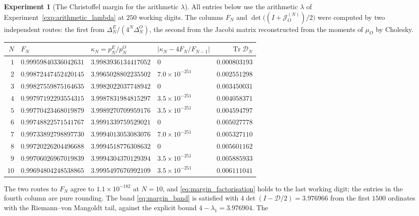 \documentclass[11pt]{amsart}
\numberwithin{equation}{section}
\theoremstyle{plain}
\theoremstyle{definition}
\newtheorem{experiment}[theorem]{Experiment}
\theoremstyle{remark}
\newcommand{\Tr}{\operatorname{Tr}}
\begin{document}
\begin{experiment}[The Christoffel margin for the arithmetic $\lambda$]
\label{exp:christoffel_margin}
All entries below use the arithmetic $\lambda$ of Experiment~\ref{exp:arithmetic_lambda}
at $250$ working digits.  The columns $F_N$ and $\det\bigl((I+\mathcal J_O^{(N)})/2\bigr)$ were
computed by two independent routes: the first from
$\Delta_N^E/(4^N\Delta_N^O)$, the second from the Jacobi matrix reconstructed from the
moments of $\mu_O$ by Cholesky.
\begin{center}
\small
\begin{tabular}{rlllr}
\toprule
$N$ & $F_N$ & $\kappa_N=p_N^E/p_N^O$ & $|\kappa_N-4F_N/F_{N-1}|$ & $\Tr\mathcal D_N$\\
\midrule
$1$  & $0.99959840336042631$ & $3.9983936134417052$ & $0$                  & $0.000803193$\\
$2$  & $0.99872447452420145$ & $3.9965028802235502$ & $7.0\times10^{-251}$ & $0.002551298$\\
$3$  & $0.99827559875164635$ & $3.9982022037748942$ & $0$                  & $0.003450031$\\
$4$  & $0.99797192293554315$ & $3.9987831984815297$ & $3.5\times10^{-251}$ & $0.004058371$\\
$5$  & $0.99770423468019879$ & $3.9989270709959176$ & $3.5\times10^{-251}$ & $0.004594797$\\
$6$  & $0.99748822571541767$ & $3.9991339759529021$ & $0$                  & $0.005027778$\\
$7$  & $0.99733892798897730$ & $3.9994013053083076$ & $7.0\times10^{-251}$ & $0.005327110$\\
$8$  & $0.99720226204496688$ & $3.9994518776308632$ & $0$                  & $0.005601162$\\
$9$  & $0.99706026967019839$ & $3.9994304370129394$ & $3.5\times10^{-251}$ & $0.005885933$\\
$10$ & $0.99694804248538865$ & $3.9995497676992109$ & $3.5\times10^{-251}$ & $0.006111041$\\
\bottomrule
\end{tabular}
\end{center}
The two routes to $F_N$ agree to $1.1\times10^{-182}$ at $N=10$, and
\eqref{eq:margin_factorisation} holds to the last working digit; the entries in the fourth
column are pure rounding.  The band \eqref{eq:margin_band} is satisfied with
$4\det(I-\mathcal D/2)=3.976966$ from the first $1500$ ordinates with the
Riemann--von Mangoldt tail, against the explicit bound $4-\lambda_1=3.976904$.  The

\end{experiment}
\end{document}
